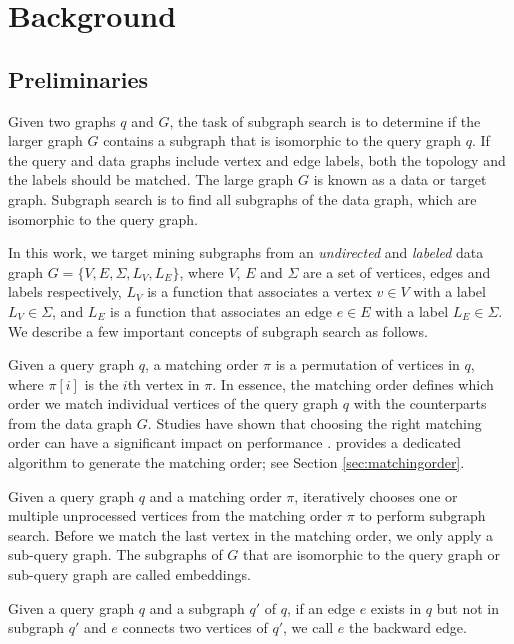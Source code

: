 \section{Background}

\subsection{Preliminaries\label{sec:pre}}
Given two graphs $q$ and $G$, the task of subgraph search is to determine if the larger graph $G$ contains a subgraph that is isomorphic
to the query graph $q$. If the query and data graphs include vertex and edge labels, both the topology and the labels should be matched. The large graph $G$ is known as a data or target graph.  Subgraph search is to find all subgraphs  of the data graph, which are isomorphic to the query graph.

In this work, we target mining subgraphs from an \emph{undirected} and \emph{labeled} data graph $G=\{V,E,\Sigma,L_V,L_E\}$, where $V$, $E$
and $\Sigma$ are a set of vertices, edges and labels respectively,  $L_V$ is a function that associates a vertex $v \in V$ with a label
$L_V \in \Sigma$, and $L_E$ is a function that associates an edge $e \in E$ with a label $L_E \in \Sigma$. We describe a few important concepts of subgraph search as follows.

 Given a query graph $q$, a matching order $\pi$ is a permutation of vertices in $q$, where $\pi[i]$ is the
$i$th vertex in $\pi$. In essence, the matching order defines which order we match individual vertices of the query graph $q$ with the
counterparts from the data graph $G$. Studies have shown that choosing the right matching order can have a significant impact on
performance \cite{bi2016efficient,sun2020subgraph,sun2020rapidmatch,guo2020gpu}.  \SystemName provides a dedicated algorithm to generate
the matching order; see Section \ref {sec:matchingorder}.

 Given a query graph $q$ and a matching order $\pi$, \SystemName iteratively chooses  one or multiple
unprocessed vertices from the matching order $\pi$ to perform subgraph search. Before we match the last vertex in the matching order, we
only apply a sub-query graph. The subgraphs of $G$ that are isomorphic to the query graph or sub-query graph are called embeddings.

 Given a query graph $q$ and a subgraph $q'$ of $q$, if an edge $e$ exists in $q$ but not in subgraph $q'$ and
$e$ connects two vertices of $q'$, we call $e$ the backward edge.

